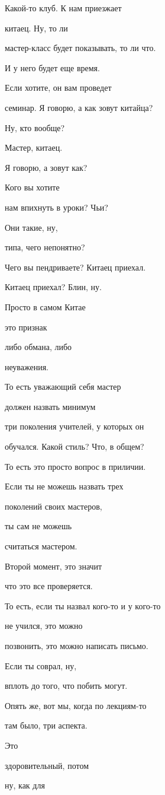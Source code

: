 Какой-то клуб. К нам приезжает

китаец. Ну, то ли

мастер-класс будет показывать, то ли что.

И у него будет еще время.

Если хотите, он вам проведет

семинар. Я говорю, а как зовут китайца?

Ну, кто вообще?

Мастер, китаец.

Я говорю, а зовут как?

Кого вы хотите

нам впихнуть в уроки? Чьи?

Они такие, ну,

типа, чего непонятно?

Чего вы пендриваете? Китаец приехал.

Китаец приехал? Блин, ну.

Просто в самом Китае

это признак

либо обмана, либо

неуважения.

То есть уважающий себя мастер

должен назвать минимум

три поколения учителей, у которых он

обучался. Какой стиль? Что, в общем?

То есть это просто вопрос в приличии.

Если ты не можешь назвать трех

поколений своих мастеров,

ты сам не можешь

считаться мастером.

Второй момент, это значит

что это все проверяется.

То есть, если ты назвал кого-то и у кого-то

не учился, это можно

позвонить, это можно написать письмо.

Если ты соврал, ну,

вплоть до того, что побить могут.

Опять же, вот мы, когда по лекциям-то

там было, три аспекта.

Это

здоровительный, потом

ну, как для

